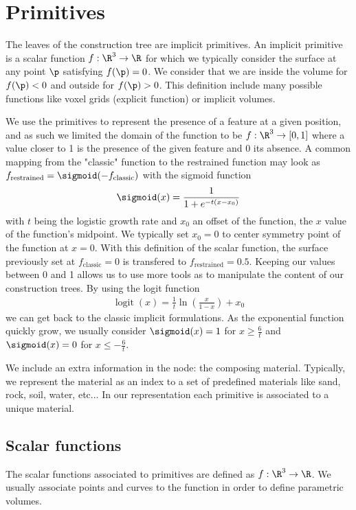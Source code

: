\section{Primitives}
The leaves of the construction tree are implicit primitives. An implicit primitive is a scalar function $f: \R^3 \to \R$ for which we typically consider the surface at any point $\p$ satisfying $f(\p) = 0$. We consider that we are inside the volume for $f(\p) < 0$ and outside for $f(\p) > 0$. This definition include many possible functions like voxel grids (explicit function) or implicit volumes.

We use the primitives to represent the presence of a feature at a given position, and as such we limited the domain of the function to be $f: \R^3 \to [0, 1]$ where a value closer to 1 is the presence of the given feature and 0 its absence. A common mapping from the "classic" function to the restrained function may look as $f_{\text{restrained}} = \sigmoid (- f_{\text{classic}})$ with the sigmoid function 
\begin{align}
    \sigmoid(x) = \frac{1}{1+e^{-t(x - x_0)}}
\end{align}    
with $t$ being the logistic growth rate and $x_0$ an offset of the function, the $x$ value of the function's midpoint. We typically set $x_0 = 0$ to center symmetry point of the function at $x = 0$. With this definition of the scalar function, the surface previously set at $f_{\text{classic}} = 0$ is transfered to $f_{\text{restrained}} = 0.5$. Keeping our values between 0 and 1 allows us to use more tools as to manipulate the content of our construction trees. By using the logit function 
\begin{align}
    \operatorname{logit}(x)=\frac{1}{t}\ln\left(\frac{x}{1-x}\right)+x_0
\end{align}
we can get back to the classic implicit formulations. As the exponential function quickly grow, we usually consider $\sigmoid(x)=1$ for $x \geq \frac{6}{t}$ and $\sigmoid(x)=0$ for $x \leq -\frac{6}{t}$.

We include an extra information in the node: the composing material. Typically, we represent the material as an index to a set of predefined materials like sand, rock, soil, water, etc... In our representation each primitive is associated to a unique material. 

\subsection{Scalar functions}
The scalar functions associated to primitives are defined as $f: \R^3 \to \R$. We usually associate points and curves to the function in order to define parametric volumes.

